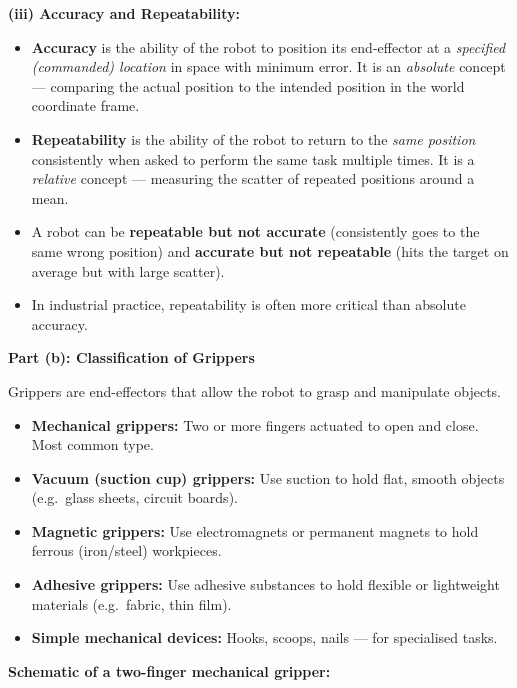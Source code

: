 \documentclass[12pt,a3paper]{article}
\begin{document}
\begin{enumerate}
\begin{tcolorbox}[enhanced,breakable,ansbox,colback=cA!4,colframe=cA,
  boxrule=0.8pt,arc=5pt,
  title={\textbf{Answer}},fonttitle=\bfseries\color{white},colbacktitle=cA]
\textbf{(iii) Accuracy and Repeatability:}
\begin{itemize}[leftmargin=1.5em,itemsep=2pt]
  \item \textbf{Accuracy} is the ability of the robot to position its
        end-effector at a \emph{specified (commanded) location} in space with
        minimum error. It is an \emph{absolute} concept — comparing the actual
        position to the intended position in the world coordinate frame.
  \item \textbf{Repeatability} is the ability of the robot to return to the
        \emph{same position} consistently when asked to perform the same task
        multiple times. It is a \emph{relative} concept — measuring the scatter
        of repeated positions around a mean.
  \item A robot can be \textbf{repeatable but not accurate} (consistently goes
        to the same wrong position) and \textbf{accurate but not repeatable}
        (hits the target on average but with large scatter).
  \item In industrial practice, repeatability is often more critical than
        absolute accuracy.
\end{itemize}

\hrulefill

\textbf{Part (b): Classification of Grippers}

Grippers are end-effectors that allow the robot to grasp and manipulate objects.

\begin{itemize}[leftmargin=1.5em,itemsep=2pt]
  \item \textbf{Mechanical grippers:} Two or more fingers actuated to open and
        close. Most common type.
  \item \textbf{Vacuum (suction cup) grippers:} Use suction to hold flat,
        smooth objects (e.g.\ glass sheets, circuit boards).
  \item \textbf{Magnetic grippers:} Use electromagnets or permanent magnets
        to hold ferrous (iron/steel) workpieces.
  \item \textbf{Adhesive grippers:} Use adhesive substances to hold flexible or
        lightweight materials (e.g.\ fabric, thin film).
  \item \textbf{Simple mechanical devices:} Hooks, scoops, nails — for
        specialised tasks.
\end{itemize}

\textbf{Schematic of a two-finger mechanical gripper:}



\end{tcolorbox}
\end{enumerate}
\end{document}
